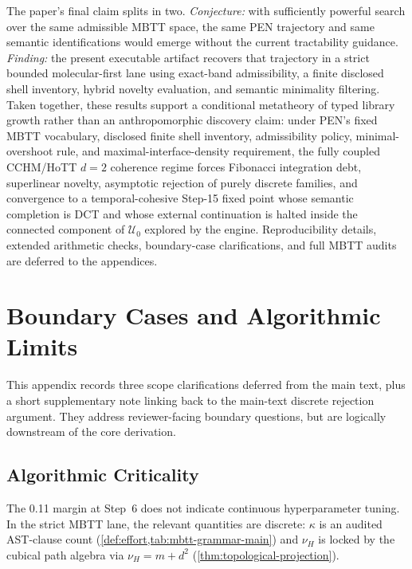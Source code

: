 \documentclass[11pt,a4paper]{article}
\theoremstyle{plain}
\theoremstyle{definition}
\theoremstyle{remark}
\newcommand{\U}{\mathcal{U}}
\begin{document}
The paper's final claim splits in two.
\emph{Conjecture:} with sufficiently powerful search over the same admissible MBTT space, the same PEN trajectory and same semantic identifications would emerge without the current tractability guidance.
\emph{Finding:} the present executable artifact recovers that trajectory in a strict bounded molecular-first lane using exact-band admissibility, a finite disclosed shell inventory, hybrid novelty evaluation, and semantic minimality filtering.
Taken together, these results support a conditional metatheory of typed library growth rather than an anthropomorphic discovery claim: under PEN's fixed MBTT vocabulary, disclosed finite shell inventory, admissibility policy, minimal-overshoot rule, and maximal-interface-density requirement, the fully coupled CCHM/HoTT $d=2$ coherence regime forces Fibonacci integration debt, superlinear novelty, asymptotic rejection of purely discrete families, and convergence to a temporal-cohesive Step-15 fixed point whose semantic completion is DCT and whose external continuation is halted inside the connected component of $\U_0$ explored by the engine.
Reproducibility details, extended arithmetic checks, boundary-case clarifications, and full MBTT audits are deferred to the appendices.

\appendix

\section{Boundary Cases and Algorithmic Limits}
\label{sec:boundaries}

This appendix records three scope clarifications deferred from the main text, plus a short supplementary note linking back to the main-text discrete rejection argument.
They address reviewer-facing boundary questions, but are logically downstream of the core derivation.

\subsection{Algorithmic Criticality}
\label{sec:criticality}

The 0.11 margin at Step~6 does not indicate continuous hyperparameter tuning.
In the strict MBTT lane, the relevant quantities are discrete: $\kappa$ is an audited AST-clause count (\cref{def:effort,tab:mbtt-grammar-main}) and $\nu_H$ is locked by the cubical path algebra via $\nu_H = m + d^2$ (\cref{thm:topological-projection}).
\end{document}
